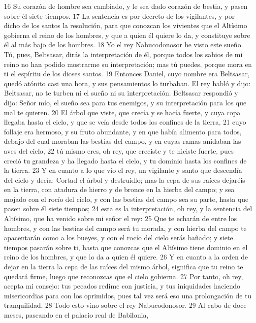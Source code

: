 16 Su corazón de hombre sea cambiado, y le sea dado corazón de bestia, y pasen sobre él siete tiempos.
17 La sentencia es por decreto de los vigilantes, y por dicho de los santos la resolución, para que conozcan los vivientes que el Altísimo gobierna el reino de los hombres, y que a quien él quiere lo da, y constituye sobre él al más bajo de los hombres.
18 Yo el rey Nabucodonosor he visto este sueño. Tú, pues, Beltsasar, dirás la interpretación de él, porque todos los sabios de mi reino no han podido mostrarme su interpretación; mas tú puedes, porque mora en ti el espíritu de los dioses santos.
19 Entonces Daniel, cuyo nombre era Beltsasar, quedó atónito casi una hora, y sus pensamientos lo turbaban. El rey habló y dijo: Beltsasar, no te turben ni el sueño ni su interpretación. Beltsasar respondió y dijo: Señor mío, el sueño sea para tus enemigos, y su interpretación para los que mal te quieren.
20 El árbol que viste, que crecía y se hacía fuerte, y cuya copa llegaba hasta el cielo, y que se veía desde todos los confines de la tierra,
21 cuyo follaje era hermoso, y su fruto abundante, y en que había alimento para todos, debajo del cual moraban las bestias del campo, y en cuyas ramas anidaban las aves del cielo,
22 tú mismo eres, oh rey, que creciste y te hiciste fuerte, pues creció tu grandeza y ha llegado hasta el cielo, y tu dominio hasta los confines de la tierra.
23 Y en cuanto a lo que vio el rey, un vigilante y santo que descendía del cielo y decía: Cortad el árbol y destruidlo; mas la cepa de sus raíces dejaréis en la tierra, con atadura de hierro y de bronce en la hierba del campo; y sea mojado con el rocío del cielo, y con las bestias del campo sea su parte, hasta que pasen sobre él siete tiempos;
24 esta es la interpretación, oh rey, y la sentencia del Altísimo, que ha venido sobre mi señor el rey:
25 Que te echarán de entre los hombres, y con las bestias del campo será tu morada, y con hierba del campo te apacentarán como a los bueyes, y con el rocío del cielo serás bañado; y siete tiempos pasarán sobre ti, hasta que conozcas que el Altísimo tiene dominio en el reino de los hombres, y que lo da a quien él quiere.
26 Y en cuanto a la orden de dejar en la tierra la cepa de las raíces del mismo árbol, significa que tu reino te quedará firme, luego que reconozcas que el cielo gobierna.
27 Por tanto, oh rey, acepta mi consejo: tus pecados redime con justicia, y tus iniquidades haciendo misericordias para con los oprimidos, pues tal vez será eso una prolongación de tu tranquilidad.
28 Todo esto vino sobre el rey Nabucodonosor.
29 Al cabo de doce meses, paseando en el palacio real de Babilonia,
